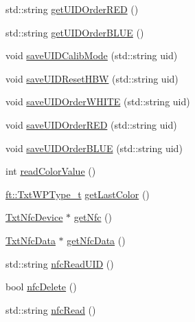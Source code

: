 \begin{DoxyCompactItemize}
std\+::string \hyperlink{classft_1_1_txt_delivery_pickup_station_a6cf61e92c3ca2a0714aab0c10e20bc0d}{get\+U\+I\+D\+Order\+R\+ED} ()
\item 
std\+::string \hyperlink{classft_1_1_txt_delivery_pickup_station_acae940a2dd3ddb7574de62f8acda3efe}{get\+U\+I\+D\+Order\+B\+L\+UE} ()
\item 
void \hyperlink{classft_1_1_txt_delivery_pickup_station_ab53d853ce517143fc7f366c35c9c9320}{save\+U\+I\+D\+Calib\+Mode} (std\+::string uid)
\item 
void \hyperlink{classft_1_1_txt_delivery_pickup_station_a97f61e85f04760e73b8dfeb5c0dda06d}{save\+U\+I\+D\+Reset\+H\+BW} (std\+::string uid)
\item 
void \hyperlink{classft_1_1_txt_delivery_pickup_station_a512e9257c9e08dedd3cc6fab50b5184d}{save\+U\+I\+D\+Order\+W\+H\+I\+TE} (std\+::string uid)
\item 
void \hyperlink{classft_1_1_txt_delivery_pickup_station_aa0f590a1934992f560c10af54d21cf3a}{save\+U\+I\+D\+Order\+R\+ED} (std\+::string uid)
\item 
void \hyperlink{classft_1_1_txt_delivery_pickup_station_af92b3ea609de2523942e56564f976262}{save\+U\+I\+D\+Order\+B\+L\+UE} (std\+::string uid)
\item 
int \hyperlink{classft_1_1_txt_delivery_pickup_station_af105371e606d2156bc78ee43952d40b4}{read\+Color\+Value} ()
\item 
\hyperlink{namespaceft_a2d5bf01b2da29de3c061682f3195b5b2}{ft\+::\+Txt\+W\+P\+Type\+\_\+t} \hyperlink{classft_1_1_txt_delivery_pickup_station_a0878e7eeeaa94632bf5e0407c64fa6ed}{get\+Last\+Color} ()
\item 
\hyperlink{classft_1_1_txt_nfc_device}{Txt\+Nfc\+Device} $\ast$ \hyperlink{classft_1_1_txt_delivery_pickup_station_a4d8140448d31866e61c489dae4a09173}{get\+Nfc} ()
\item 
\hyperlink{classft_1_1_txt_nfc_data}{Txt\+Nfc\+Data} $\ast$ \hyperlink{classft_1_1_txt_delivery_pickup_station_a270ffe79519cc93f513b7c5543beb576}{get\+Nfc\+Data} ()
\item 
std\+::string \hyperlink{classft_1_1_txt_delivery_pickup_station_aab8d46490aa94b1df899bc29206b33cd}{nfc\+Read\+U\+ID} ()
\item 
bool \hyperlink{classft_1_1_txt_delivery_pickup_station_aef5d9f6bdeb9b3aa65b1967171f113b1}{nfc\+Delete} ()
\item 
std\+::string \hyperlink{classft_1_1_txt_delivery_pickup_station_a66213ba740a374609ee83d8b40dadb8b}{nfc\+Read} ()
\item 

\end{DoxyCompactItemize}
